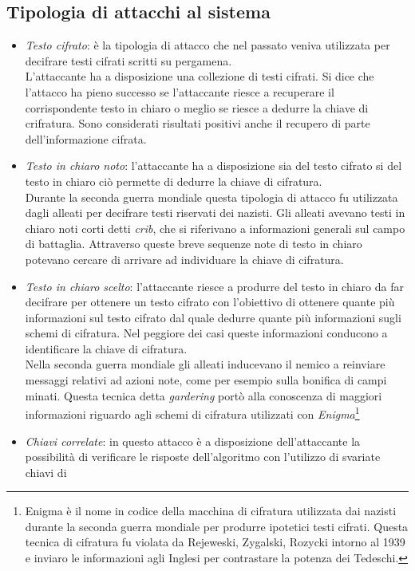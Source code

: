 \documentclass[11pt, a4paper, oneside]{Thesis} %
\begin{document}
\subsection{Tipologia di attacchi al sistema}
\begin{itemize}
 \item \textit{Testo cifrato}: è la tipologia di attacco che nel passato veniva utilizzata per decifrare testi cifrati scritti su pergamena. 
 \\L'attaccante ha a disposizione una collezione di testi cifrati. Si dice che l'attacco ha pieno successo se l'attaccante riesce a 
 recuperare il corrispondente testo in chiaro o meglio se riesce a dedurre la chiave di crifratura. Sono considerati risultati positivi anche il recupero di parte dell'informazione
 cifrata.
 \item \textit{Testo in chiaro noto}: l'attaccante ha a disposizione sia del testo cifrato si del testo in chiaro ciò permette di dedurre la chiave di cifratura. 
 \\ Durante la seconda guerra mondiale questa tipologia di attacco fu utilizzata dagli alleati per decifrare testi riservati dei nazisti. Gli alleati avevano testi in chiaro noti
 corti detti \textit{crib}, che si riferivano a informazioni generali sul campo di battaglia. Attraverso queste breve sequenze note di testo in chiaro potevano cercare di arrivare 
 ad individuare la chiave di cifratura.
 \item \textit{Testo in chiaro scelto}: l'attaccante riesce a produrre del testo in chiaro da far decifrare per ottenere un testo cifrato con l'obiettivo di ottenere quante più
 informazioni sul testo cifrato dal quale dedurre quante più informazioni sugli schemi di cifratura. Nel peggiore dei casi queste informazioni conducono a identificare la chiave di 
 cifratura.
 \\ Nella seconda guerra mondiale gli alleati inducevano il nemico a reinviare messaggi relativi ad azioni note, come per esempio sulla bonifica di campi minati. Questa tecnica 
 detta \textit{gardering} portò alla conoscenza di maggiori informazioni riguardo agli schemi di cifratura utilizzati con \textit{Enigma}\footnote{Enigma è il nome in codice della macchina
 di cifratura utilizzata dai nazisti durante la seconda guerra mondiale per produrre ipotetici testi cifrati. Questa tecnica di cifratura fu violata da Rejeweski, Zygalski, Rozycki 
 intorno al 1939 e inviaro le informazioni agli Inglesi per contrastare la potenza dei Tedeschi.}
 \item \textit{Chiavi correlate}: in questo attacco è a disposizione dell'attaccante la possibilità di verificare le risposte dell'algoritmo con l'utilizzo di svariate chiavi di 

\end{itemize}
\end{document}
